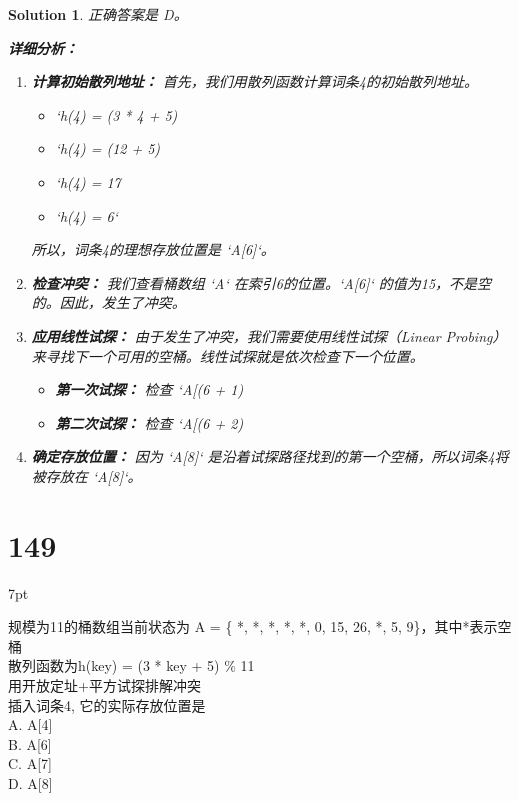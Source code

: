 \documentclass[UTF8]{report}
\newtheorem{solution}{Solution}
\theoremstyle{MyLineTheoremStyle} %
\theoremstyle{MyBlockTheoremStyle} %
\theoremstyle{MySubsubsectionStyle} %
\newenvironment{graybox}{%
        \def\FrameCommand{%
        \hspace{1pt}%
        {\color{gray}\small \vrule width 2pt}%
        {\color{graybox_color}\vrule width 4pt}%
        \colorbox{graybox_color}%
        }%
        \MakeFramed{\advance\hsize-\width\FrameRestore}%
        \noindent\hspace{-4.55pt}%
        \begin{adjustwidth}{}{7pt}%
        \vspace{2pt}\vspace{2pt}%
        }
        {%
        \vspace{2pt}\end{adjustwidth}\endMakeFramed%
        }
\begin{document}
\begin{solution}
正确答案是 D。

\textbf{详细分析：}

\begin{enumerate}
    \item \textbf{计算初始散列地址：}
    首先，我们用散列函数计算词条4的初始散列地址。
    \begin{itemize}
        \item `h(4) = (3 * 4 + 5) %
        \item `h(4) = (12 + 5) %
        \item `h(4) = 17 %
        \item `h(4) = 6`
    \end{itemize}
    所以，词条4的理想存放位置是 `A[6]`。

    \item \textbf{检查冲突：}
    我们查看桶数组 `A` 在索引6的位置。`A[6]` 的值为15，不是空的。因此，发生了冲突。

    \item \textbf{应用线性试探：}
    由于发生了冲突，我们需要使用线性试探（Linear Probing）来寻找下一个可用的空桶。线性试探就是依次检查下一个位置。
    \begin{itemize}
        \item \textbf{第一次试探：} 检查 `A[(6 + 1) %
        \item \textbf{第二次试探：} 检查 `A[(6 + 2) %
    \end{itemize}

    \item \textbf{确定存放位置：}
    因为 `A[8]` 是沿着试探路径找到的第一个空桶，所以词条4将被存放在 `A[8]`。
\end{enumerate}
\end{solution}



\section*{149}
\begin{graybox}
规模为11的桶数组当前状态为 A = \{ *, *,
*, *, *, 0, 15, 26, *, 5, 9\}，其中*表示空
桶\\
散列函数为h(key) = (3 * key + 5) \% 11\\
用开放定址+平方试探排解冲突\\
插入词条4, 它的实际存放位置是\\
A. A[4]\\
B. A[6]\\
C. A[7]\\
D. A[8]
\end{graybox}
\end{document}
